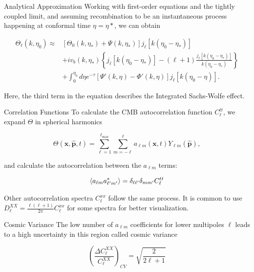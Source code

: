 \documentclass[serif, aspectratio=169]{beamer}
\begin{document}
\begin{frame}{Analytical Approximation}
Working with first-order equations and the tightly coupled limit, and assuming recombination to be an instantaneous process happening at conformal time $\eta=\eta*$, we can obtain

\begin{equation}\label{Thetal_approx}
\begin{split}
    \Theta_\ell(k,\eta_0)\approx &[\Theta_0(k,\eta_*)+\Psi(k,\eta_*)]j_\ell[k(\eta_0-\eta_*)]\\
    &+iv_b(k,\eta_*)\left\{j_\ell[k(\eta_0-\eta_*)]-(\ell+1)\frac{j_\ell[k(\eta_0-\eta_*)]}{k(\eta_0-\eta_*)}\right\}\\
    &+\int_0^{\eta_0} d\eta e^{-\tau}[\Psi'(k,\eta)-\Phi'(k,\eta)]j_\ell[k(\eta_0-\eta)].
\end{split}
\end{equation}

Here, the third term in the equation describes the Integrated Sachs-Wolfe effect.
\end{frame}

\begin{frame}{Correlation Functions}
To calculate the CMB autocorrelation function $C_\ell^{tt}$, we expand $\Theta$ in spherical harmonics

\begin{equation}
    \Theta(\mathbf{x}, \hat{\mathbf{p}},t)=\sum_{\ell=1}^{\ell_\text{max}}\sum_{m=-\ell}^\ell a_{\ell m}(\mathbf{x},t)Y_{\ell m}(\hat{\mathbf{p}}),
\end{equation}

and calculate the autocorrelation between the $a_{\ell m}$ terms:

\begin{equation}
    \left\langle a_{\ell m} a_{\ell' m'}^* \right\rangle=\delta_{\ell \ell'}\delta_{m m'}C_\ell^{tt}
\end{equation}

Other autocorrelation spectra $C_\ell^{xx}$ follow the same process. It is common to use $D_\ell^{XX}=\frac{\ell(\ell+1)}{2\pi}C_\ell^{xx}$ for some spectra for better visualization.

\end{frame}

\begin{frame}{Cosmic Variance}
    The low number of $a_{\ell m}$ coefficients for lower multipoles $\ell$ leads to a high uncertainty in this region called cosmic variance

    \begin{equation}\label{cosmic_variance}
        \left(\frac{\Delta C_\ell^{XX}}{C_\ell^{XX}}\right)_{CV}=\sqrt{\frac{2}{2\ell+1}}
    \end{equation}
\end{frame}
\end{document}
